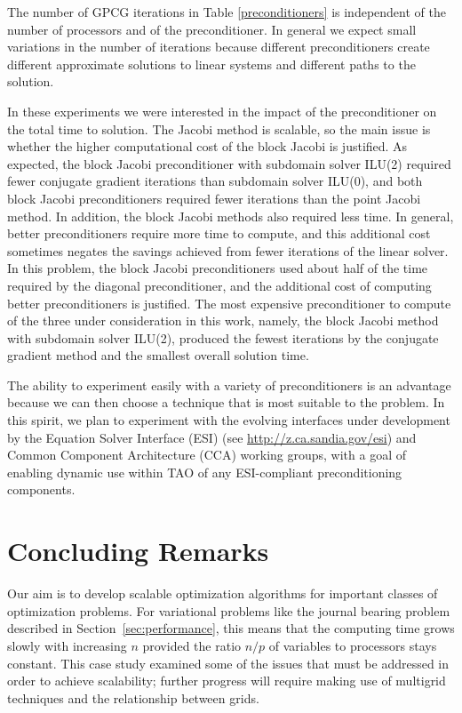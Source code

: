 The number of GPCG iterations in Table \ref{preconditioners}
is independent of the number of
processors and of the preconditioner. 
In general we expect small variations in the number of iterations 
because different preconditioners create different approximate solutions
to linear systems and different paths to the solution.

In these experiments we were interested in the impact of
the preconditioner on the total time to solution. The Jacobi method is
scalable, so the main issue is whether the higher computational
cost of the block Jacobi is justified.
As expected, the block Jacobi preconditioner with subdomain solver ILU(2)
required fewer conjugate gradient iterations than subdomain solver ILU(0),
and both block Jacobi preconditioners required fewer
iterations than the point Jacobi method.
In addition, the block Jacobi methods also required less time.
In general, better preconditioners require more time to compute, and
this additional cost sometimes negates the savings achieved from fewer
iterations of the linear solver. 
In this problem, 
the block Jacobi preconditioners used
about half of  the time required by the diagonal preconditioner, and
the additional cost of computing better preconditioners is justified.
The most expensive preconditioner to compute of the three under consideration
in this work, namely, the block Jacobi method with subdomain solver ILU(2),
produced the fewest iterations by
the conjugate gradient method and the smallest overall solution time.

The ability to experiment easily with a variety of preconditioners is
an advantage because we can then choose a technique that is most
suitable to the problem.  In this spirit, we plan to experiment with
the evolving interfaces under development by the Equation Solver
Interface (ESI) (see \url{http://z.ca.sandia.gov/esi}) 
and Common Component Architecture
(CCA) \cite{cca99} working groups, with a goal of
enabling dynamic use within TAO of any ESI-compliant preconditioning
components.

\section{Concluding Remarks}

Our aim is to develop scalable optimization algorithms
for important classes of optimization problems.
For variational problems like the journal bearing problem
described in Section~\ref{sec:performance}, this means that
the computing time grows slowly with increasing $n$
provided the ratio $ n/p $ of variables to processors stays constant.
This case study examined some of the issues that must be
addressed in order to achieve scalability;
further progress will require making use of multigrid
techniques and the relationship between grids.

